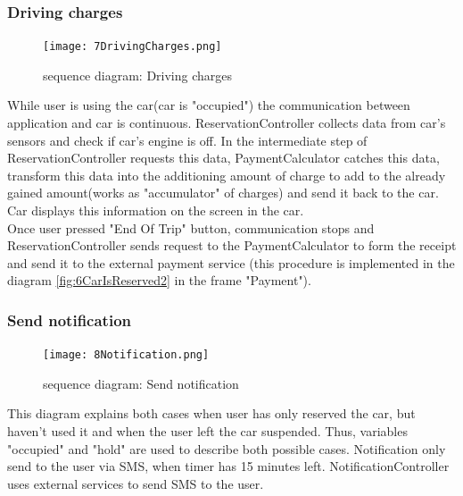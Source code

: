 \documentclass[12pt, letterpaper]{article}
\begin{document}
\subsubsection{Driving charges}
\begin{figure}[H]
\centering
\texttt{[image: 7DrivingCharges.png]} 
\caption{sequence diagram: Driving charges}
\label{fig:7DrivingCharges}
\end{figure}
\newpage

While user is using the car(car is "occupied") the communication between application and car is continuous. ReservationController collects data from car's sensors and check if car's engine is off. In the intermediate step of ReservationController requests this data, PaymentCalculator catches this data, transform this data into the additioning amount of charge to add to the already gained amount(works as "accumulator" of charges) and send it back to the car. Car displays this information on the screen in the car. \\
Once user pressed "End Of Trip" button, communication stops and ReservationController sends request to the PaymentCalculator to form the receipt and send it to the external payment service (this procedure is implemented in the diagram \ref{fig:6CarIsReserved2} in the frame "Payment"). 
\newpage

\subsubsection{Send notification}
\begin{figure}[H]
\centering
\texttt{[image: 8Notification.png]} 
\caption{sequence diagram: Send notification}
\label{fig:8Notification}
\end{figure}
\newpage

This diagram explains both cases when user has only reserved the car, but haven't used it and when the user left the car suspended. Thus, variables "occupied" and "hold" are used to describe both possible cases. Notification only send to the user via SMS, when timer has 15 minutes left. NotificationController uses external services to send SMS to the user. 

\newpage
\end{document}
